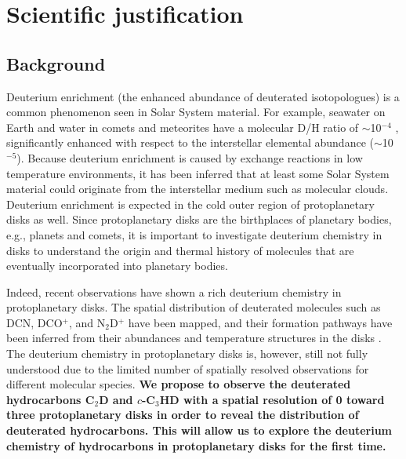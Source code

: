 \documentclass[12pt,a4paper]{article}  %
\begin{document}
\pagestyle{plain}
 



\section{Scientific justification}
\subsection{Background}
Deuterium enrichment (the enhanced abundance of deuterated isotopologues) is a common phenomenon seen in Solar System material. For example, seawater on Earth and water in comets and meteorites have a molecular D/H ratio of $\sim$10$^{-4}$ \citep{Mumma11}, significantly enhanced with respect to the interstellar elemental abundance ($\sim$10$^{-5}$). Because deuterium enrichment is caused by exchange reactions in low temperature environments, it has been inferred that at least some Solar System material could originate from the interstellar medium such as molecular clouds. Deuterium enrichment is expected in the cold outer region of protoplanetary disks as well. %
Since protoplanetary disks are the birthplaces of planetary bodies, e.g., planets and comets, it is important to investigate deuterium chemistry in disks to understand the origin and thermal history of molecules that are eventually incorporated into planetary bodies.

Indeed, recent observations have shown a rich deuterium chemistry in protoplanetary disks. The spatial distribution of deuterated molecules such as DCN, DCO$^+$, and N$_2$D$^+$ have been mapped, and their formation pathways have been inferred from their abundances and temperature structures in the disks \citep[e.g.,][]{Huang17, Salinas17, Oberg21_TWHya, Cataldi21}. The deuterium chemistry in protoplanetary disks is, however, still not fully understood due to the limited number of spatially resolved observations for different molecular species. \textbf{We propose to observe the deuterated hydrocarbons C$_2$D and $c$-C$_3$HD with a spatial resolution of 0 toward three protoplanetary disks in order to reveal the distribution of deuterated hydrocarbons. This will allow us to explore the deuterium chemistry of hydrocarbons in protoplanetary disks for the first time.}
\end{document}
